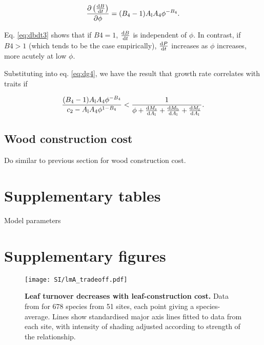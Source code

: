 \documentclass[12pt, a4paper]{article}
\makeatletter
\def\maxwidth{\ifdim\Gin@nat@width>\linewidth\linewidth
\else\Gin@nat@width\fi}
\let\Oldincludegraphics\includegraphics
\renewcommand{\includegraphics}[1]{\Oldincludegraphics[width=\maxwidth]{#1}}
\makeatother
\begin{document}
\begin{appendices}
\begin{equation}\label{eq:dbdt3}
\frac{\partial \left( \frac{ {\rm d}B} {{\rm d}t}\right)}{\partial \phi}  =
(B_4-1) A_{\rm l} A_4\phi ^{-B_4}.
\end{equation}

Eq. \ref{eq:dbdt3} shows that if $B4=1$, $\frac{ {\rm d}B} {{\rm d}t}$ is independent
of $\phi$. In contrast, if $B4>1$ (which tends to be the case empirically), $\frac{ \textrm
{d}P} {{\rm d}t}$ increases as $\phi$ increases, more acutely at low $\phi$.

Substituting into eq. \ref{eq:dg4}, we have the result that growth rate correlates
with traits if

\begin{equation} \label{eq:G6}
\frac{(B_4-1) A_{\rm l} A_4\phi ^{-B_4}}{c_2 - A_{\rm l} A_4 \phi ^{1-B_4}}
< \frac{1}{\phi
 + \frac{{\rm d}M_\textrm{s}}{{\rm d}A_{\rm l}} + \frac{{\rm d}M_\textrm
 {b}}{{\rm d}A_{\rm l}} + \frac{{\rm d}M_{\rm r}}{{\rm d}A_{\rm l}}}.
\end{equation}

\subsection{Wood construction cost}

Do similar to previous section for wood construction cost.

\newpage

\section{Supplementary tables}\label{supplementary-tables}

\begin{table}[ht]
\caption{Model parameters}
\centering
{\footnotesize  %
\begin{doublespace}
% 

\end{doublespace}
}
\label{tab:params}
\end{table}

\newpage

\section{Supplementary figures}\label{supplementary-figures}

\begin{figure}[ht]
\centering
\texttt{[image: SI/lmA\_tradeoff.pdf]}
\caption{\textbf{Leaf turnover decreases with leaf-construction cost.}
Data from \citep{wright-2004} for 678 species from 51 sites, each
point giving a species-average. Lines show standardised major axis lines
fitted to data from each site, with intensity of shading adjusted
according to strength of the relationship.\label{fS-leaf}}
\end{figure}



\end{appendices}
\end{document}
